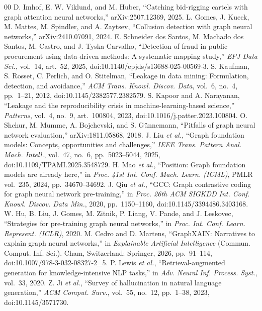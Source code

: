 \documentclass[conference]{IEEEtran}
\begin{document}
\begin{thebibliography}{00}
 D. Imhof, E. W. Viklund, and M. Huber, ``Catching bid-rigging cartels with graph attention neural networks,'' arXiv:2507.12369, 2025.
 L. Gomes, J. Kueck, M. Mattes, M. Spindler, and A. Zaytsev, ``Collusion detection with graph neural networks,'' arXiv:2410.07091, 2024.
 E. Schneider dos Santos, M. Machado dos Santos, M. Castro, and J. Tyska Carvalho, ``Detection of fraud in public procurement using data-driven methods: A systematic mapping study,'' \emph{EPJ Data Sci.}, vol.~14, art.~52, 2025, doi:10.1140/epjds/s13688-025-00569-3.
 S. Kaufman, S. Rosset, C. Perlich, and O. Stitelman, ``Leakage in data mining: Formulation, detection, and avoidance,'' \emph{ACM Trans. Knowl. Discov. Data}, vol.~6, no.~4, pp.~1--21, 2012, doi:10.1145/2382577.2382579.
 S. Kapoor and A. Narayanan, ``Leakage and the reproducibility crisis in machine-learning-based science,'' \emph{Patterns}, vol.~4, no.~9, art.~100804, 2023, doi:10.1016/j.patter.2023.100804.
 O. Shchur, M. Mumme, A. Bojchevski, and S. G\"unnemann, ``Pitfalls of graph neural network evaluation,'' arXiv:1811.05868, 2018.
 J. Liu \emph{et al.}, ``Graph foundation models: Concepts, opportunities and challenges,'' \emph{IEEE Trans. Pattern Anal. Mach. Intell.}, vol.~47, no.~6, pp.~5023--5044, 2025, doi:10.1109/TPAMI.2025.3548729.
 H. Mao \emph{et al.}, ``Position: Graph foundation models are already here,'' in \emph{Proc. 41st Int. Conf. Mach. Learn. (ICML)}, PMLR vol.~235, 2024, pp.~34670--34692.
 J. Qiu \emph{et al.}, ``GCC: Graph contrastive coding for graph neural network pre-training,'' in \emph{Proc. 26th ACM SIGKDD Int. Conf. Knowl. Discov. Data Min.}, 2020, pp.~1150--1160, doi:10.1145/3394486.3403168.
 W. Hu, B. Liu, J. Gomes, M. Zitnik, P. Liang, V. Pande, and J. Leskovec, ``Strategies for pre-training graph neural networks,'' in \emph{Proc. Int. Conf. Learn. Represent. (ICLR)}, 2020.
 M. Cedro and D. Martens, ``GraphXAIN: Narratives to explain graph neural networks,'' in \emph{Explainable Artificial Intelligence} (Commun. Comput. Inf. Sci.). Cham, Switzerland: Springer, 2026, pp.~91--114, doi:10.1007/978-3-032-08327-2\_5.
 P. Lewis \emph{et al.}, ``Retrieval-augmented generation for knowledge-intensive NLP tasks,'' in \emph{Adv. Neural Inf. Process. Syst.}, vol.~33, 2020.
 Z. Ji \emph{et al.}, ``Survey of hallucination in natural language generation,'' \emph{ACM Comput. Surv.}, vol.~55, no.~12, pp.~1--38, 2023, doi:10.1145/3571730.

\end{thebibliography}
\end{document}
